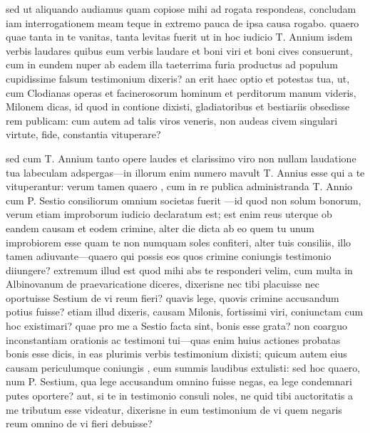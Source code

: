  sed ut aliquando audiamus quam copiose mihi ad rogata respondeas, concludam iam interrogationem meam teque in extremo pauca de ipsa causa rogabo. quaero quae tanta in te vanitas, tanta levitas fuerit ut in hoc iudicio T. Annium isdem verbis laudares quibus eum verbis laudare et boni viri et boni cives consuerunt, cum in eundem nuper ab eadem illa taeterrima furia productus ad populum cupidissime falsum testimonium dixeris? an erit haec optio et potestas tua, ut, cum Clodianas operas et facinerosorum hominum et perditorum manum videris, Milonem dicas, id quod in contione dixisti, gladiatoribus et bestiariis obsedisse rem publicam: cum autem ad talis viros veneris, non audeas civem singulari virtute, fide, constantia vituperare?

 sed cum T. Annium tanto opere laudes et clarissimo viro non nullam laudatione tua labeculam adspergas—in illorum enim numero mavult T. Annius esse qui a te vituperantur: verum tamen quaero , cum in re publica administranda T. Annio cum P. Sestio consiliorum omnium societas fuerit —id quod non solum bonorum, verum etiam improborum iudicio declaratum est; est enim reus uterque ob eandem causam et eodem crimine, alter die dicta ab eo quem tu unum improbiorem esse quam te non numquam soles confiteri, alter tuis consiliis, illo tamen adiuvante—quaero qui possis eos quos crimine coniungis testimonio diiungere? extremum illud est quod mihi abs te responderi velim, cum multa in Albinovanum de praevaricatione diceres, dixerisne nec tibi placuisse nec oportuisse Sestium de vi reum fieri? quavis lege, quovis crimine accusandum potius fuisse? etiam illud dixeris, causam Milonis, fortissimi viri, coniunctam cum hoc existimari? quae pro me a Sestio facta sint, bonis esse grata? non coarguo inconstantiam orationis ac testimoni tui—quas enim huius actiones probatas bonis esse dicis, in eas plurimis verbis testimonium dixisti; quicum autem eius causam periculumque coniungis , eum summis laudibus extulisti: sed hoc quaero, num P. Sestium, qua lege accusandum omnino fuisse negas, ea lege condemnari putes oportere? aut, si te in testimonio consuli noles, ne quid tibi auctoritatis a me tributum esse videatur, dixerisne in eum testimonium de vi quem negaris reum omnino de vi fieri debuisse?
